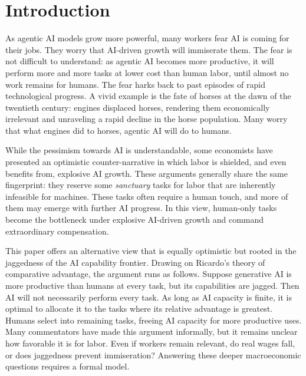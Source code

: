 \documentclass[11pt]{article}
\begin{document}
\section{Introduction}\label{sec:introduction}

As agentic AI models grow more powerful, many workers fear AI is
coming for their jobs. They worry that AI-driven growth will immiserate
them. The fear is not difficult to understand: as agentic AI becomes
more productive, it will perform more and more tasks at lower cost
than human labor, until almost no work remains for humans. The fear
harks back to past episodes of rapid technological progress. A vivid
example is the fate of horses at the dawn of the twentieth century:
engines displaced horses, rendering them economically irrelevant and
unraveling a rapid decline in the horse population. Many worry that
what engines did to horses, agentic AI will do to humans.

While the pessimism towards AI is understandable, some economists
have presented an optimistic counter-narrative in which labor is shielded,
and even benefits from, explosive AI growth. These arguments generally
share the same fingerprint: they reserve some \emph{sanctuary} tasks
for labor that are inherently infeasible for machines. These tasks
often require a human touch, and more of them may emerge with further
AI progress. In this view, human-only tasks become the bottleneck
under explosive AI-driven growth and command extraordinary compensation.

This paper offers an alternative view that is equally optimistic but
rooted in the jaggedness of the AI capability frontier. Drawing on
Ricardo's theory of comparative advantage, the argument runs as follows.
Suppose generative AI is more productive than humans at every task,
but its capabilities are jagged. Then AI will not necessarily perform
every task. As long as AI capacity is finite, it is optimal to allocate
it to the tasks where its relative advantage is greatest. Humans select
into remaining tasks, freeing AI capacity for more productive uses.
Many commentators have made this argument informally, but it remains
unclear how favorable it is for labor. Even if workers remain relevant,
do real wages fall, or does jaggedness prevent immiseration? Answering
these deeper macroeconomic questions requires a formal model.
\end{document}
